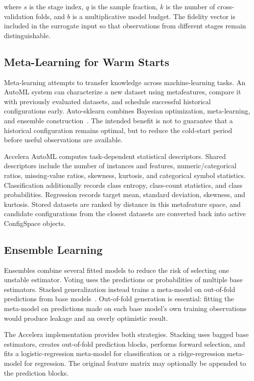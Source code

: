 \documentclass[12pt,a4paper]{report}
\begin{document}
\noindent where $s$ is the stage index, $q$ is the sample fraction, $k$ is the
number of cross-validation folds, and $b$ is a multiplicative model budget. The
fidelity vector is included in the surrogate input so that observations from
different stages remain distinguishable.

\subsection{Meta-Learning for Warm Starts}
Meta-learning attempts to transfer knowledge across machine-learning tasks. An
AutoML system can characterize a new dataset using metafeatures, compare it
with previously evaluated datasets, and schedule successful historical
configurations early. Auto-sklearn combines Bayesian optimization,
meta-learning, and ensemble construction~\cite{autosklearn}. The intended
benefit is not to guarantee that a historical configuration remains optimal, but
to reduce the cold-start period before useful observations are available.

\medskip
\noindent Accelera AutoML computes task-dependent statistical descriptors.
Shared descriptors include the number of instances and features,
numeric/categorical ratios, missing-value ratios, skewness, kurtosis, and
categorical symbol statistics. Classification additionally records class
entropy, class-count statistics, and class probabilities. Regression records
target mean, standard deviation, skewness, and kurtosis. Stored datasets are
ranked by distance in this metafeature space, and candidate configurations from
the closest datasets are converted back into active ConfigSpace objects.

\subsection{Ensemble Learning}
Ensembles combine several fitted models to reduce the risk of selecting one
unstable estimator. Voting uses the predictions or probabilities of multiple
base estimators. Stacked generalization instead trains a meta-model on
out-of-fold predictions from base models~\cite{stacking}. Out-of-fold
generation is essential: fitting the meta-model on predictions made on each
base model's own training observations would produce leakage and an overly
optimistic result.

\medskip
\noindent The Accelera implementation provides both strategies. Stacking uses
bagged base estimators, creates out-of-fold prediction blocks, performs forward
selection, and fits a logistic-regression meta-model for classification or a
ridge-regression meta-model for regression. The original feature matrix may
optionally be appended to the prediction blocks.
\end{document}
